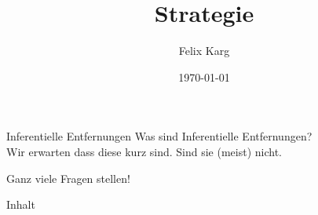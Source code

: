 \documentclass[12pt,compress,ngerman,utf8,t]{beamer}
\date{\today}
\institute{University of Freiburg}
\title{Strategie}
\author{Felix Karg}
\begin{document}
\begin{frame}[c]{Inferentielle Entfernungen}
    \large
    Was sind Inferentielle Entfernungen? \\ \pause
    Wir erwarten dass diese kurz sind. Sind sie (meist) nicht.
\end{frame}


\begin{frame}[standout]
    Ganz viele Fragen stellen!
\end{frame}


\maketitle



\begin{frame}{Inhalt}
    \small
    \begin{multicols}{2}
        \small
        \tableofcontents[hidesubsections]
    \end{multicols}
    \clearpage
\end{frame}










\end{document}
